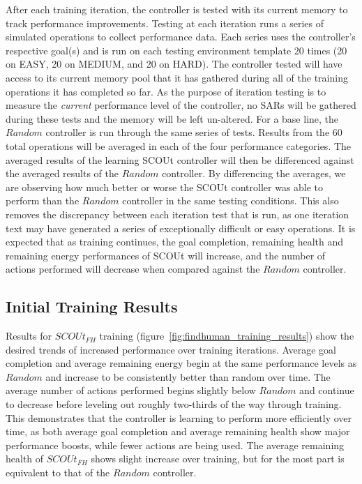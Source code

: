 After each training iteration, the controller is tested with its current memory to track performance improvements.
Testing at each iteration runs a series of simulated operations to collect performance data.
Each series uses the controller's respective goal(s) and is run on each testing environment template 20 times (20 on EASY, 20 on MEDIUM, and 20 on HARD).
The controller tested will have access to its current memory pool that it has gathered during all of the training operations it has completed so far.
As the purpose of iteration testing is to measure the \textit{current} performance level of the controller, no SARs will be gathered during these tests and the memory will be left un-altered.
For a base line, the $Random$ controller is run through the same series of tests.
Results from the 60 total operations will be averaged in each of the four performance categories.
The averaged results of the learning SCOUt controller will then be differenced against the averaged results of the $Random$ controller.
By differencing the averages, we are observing how much better or worse the SCOUt controller was able to perform than the $Random$ controller in the same testing conditions.
This also removes the discrepancy between each iteration test that is run, as one iteration text may have generated a series of exceptionally difficult or easy operations.
It is expected that as training continues, the goal completion, remaining health and remaining energy performances of SCOUt will increase, and the number of actions performed will decrease when compared against the $Random$ controller.

\subsection{Initial Training Results}
Results for $SCOUt_{FH}$ training (figure~\ref{fig:findhuman_training_results}) show the desired trends of increased performance over training iterations.
Average goal completion and average remaining energy begin at the same performance levels as $Random$ and increase to be consistently better than random over time.
The average number of actions performed begins slightly below $Random$ and continue to decrease before leveling out roughly two-thirds of the way through training.
This demonstrates that the controller is learning to perform more efficiently over time, as both average goal completion and average remaining health show major performance boosts, while fewer actions are being used.
The average remaining health of $SCOUt_{FH}$ shows slight increase over training, but for the most part is equivalent to that of the $Random$ controller.

